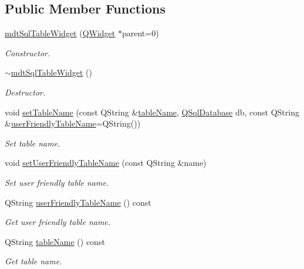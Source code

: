 \subsection*{Public Member Functions}
\begin{DoxyCompactItemize}
\item 
\hyperlink{classmdt_sql_table_widget_a4cf2b0d69608e88d33996148f612e58d}{mdt\-Sql\-Table\-Widget} (\hyperlink{class_q_widget}{Q\-Widget} $\ast$parent=0)
\begin{DoxyCompactList}\small\item\em Constructor. \end{DoxyCompactList}\item 
\hyperlink{classmdt_sql_table_widget_ab5db8a20c64340bba4841a1b1c928d7f}{$\sim$mdt\-Sql\-Table\-Widget} ()
\begin{DoxyCompactList}\small\item\em Destructor. \end{DoxyCompactList}\item 
void \hyperlink{classmdt_sql_table_widget_a36eb282b41ced6d07ffd550594101b23}{set\-Table\-Name} (const Q\-String \&\hyperlink{classmdt_sql_table_widget_a5ebff43d17810531de12c7c3eb208a85}{table\-Name}, \hyperlink{class_q_sql_database}{Q\-Sql\-Database} db, const Q\-String \&\hyperlink{classmdt_sql_table_widget_a3ed02d8946711f9f0f16b55285467839}{user\-Friendly\-Table\-Name}=Q\-String())
\begin{DoxyCompactList}\small\item\em Set table name. \end{DoxyCompactList}\item 
void \hyperlink{classmdt_sql_table_widget_aa4756dd0ac75f70327077696184960cd}{set\-User\-Friendly\-Table\-Name} (const Q\-String \&name)
\begin{DoxyCompactList}\small\item\em Set user friendly table name. \end{DoxyCompactList}\item 
Q\-String \hyperlink{classmdt_sql_table_widget_a3ed02d8946711f9f0f16b55285467839}{user\-Friendly\-Table\-Name} () const 
\begin{DoxyCompactList}\small\item\em Get user friendly table name. \end{DoxyCompactList}\item 
Q\-String \hyperlink{classmdt_sql_table_widget_a5ebff43d17810531de12c7c3eb208a85}{table\-Name} () const 
\begin{DoxyCompactList}\small\item\em Get table name. \end{DoxyCompactList}\item 

\end{DoxyCompactItemize}
